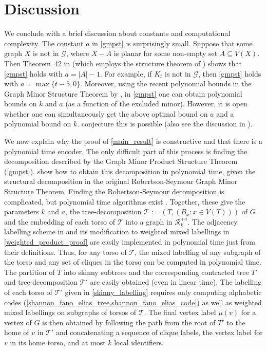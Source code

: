 \documentclass{patmorin}
\newcommand{\calG}{\mathcal{G}}
\newcommand{\calR}{\mathcal{R}}
\newcommand{\calT}{\mathcal{T}}
\begin{document}
\section{Discussion}\label{conclusion}

We conclude with a brief discussion about constants and computational complexity.  The constant $a$ in \cref{gmpst} is surprisingly small. Suppose that some graph $X$ is not in $\calG$, where $X-A$ is planar for some non-empty set $A\subseteq V(X)$. Then Theorem~42 in \citep{dujmovic.joret.ea:planar} (which employs the structure theorem of \citet{DvoTho}) shows that \cref{gmpst} holds with $a=|A|-1$. For example, if $K_t$ is not in $\calG$, then \cref{gmpst} holds with $a=\max\{t-5,0\}$. Moreover, using the recent polynomial bounds in the Graph Minor Structure Theorem by \citet{gorsky2025polynomial}, in \cref{gmpst} one can obtain polynomial bounds on $k$ and $a$ (as a function of the excluded minor). However, it is open whether one can simultaneously get the above optimal bound on $a$ and a polynomial bound on $k$. \citet[Conjecture~18.9]{gorsky2025polynomial} conjecture this is possible (also see the discussion in \citep{GSW26}).

We now explain why the proof of \cref{main_result} is constructive and that there is a polynomial time encoder.  The only difficult part of this process is finding the decomposition described by the Graph Minor Product Structure Theorem (\cref{gmpst}).  \citet{dujmovic.joret.ea:planar} show how to obtain this decomposition in polynomial time, given the structural decomposition in the original Robertson-Seymour Graph Minor Structure Theorem. Finding the Robertson-Seymour decomposition is complicated, but polynomial time algorithms exist \cite{kawarabayashi2018flat,kawarabayashi2020new,gorsky2025polynomial,demaine2005algorithmic}.  Together, these give the parameters $k$ and $a$, the tree-decomposition $\calT:=(T, (B_x:x\in V(T)))$ of $G$ and the embedding of each torso of $\calT$ into a graph in $\calR_k^{+a}$. The adjacency labelling scheme in \cite{dujmovic.esperet.ea:adjacency} and its modification to weighted mixed labellings in \cref{weighted_product_proof} are easily implemented in polynomial time just from their definitions.  Thus, for any torso of $\calT$, the mixed labelling of any subgraph of the torso and any set of cliques in the torso can be computed in polynomial time.  The partition of $T$ into skinny subtrees and the corresponding contracted tree $T'$ and tree-decomposition $\calT'$ are easily obtained (even in linear time).  The labelling of each torso of $\calT'$ given in \cref{skinny_labelling} requires only computing  alphabetic codes (\cref{shannon_fano_elias_tree,shannon_fano_elias_code}) as well as weighted mixed labellings on subgraphs of torsos of $\calT$.  The final vertex label $\mu(v)$ for a vertex of $G$ is then obtained by following the path from the root of $T'$ to the home of $v$ in $\calT'$ and concatenating a sequence of clique labels, the vertex label for $v$ in its home torso, and at most $k$ local identifiers.
\end{document}
